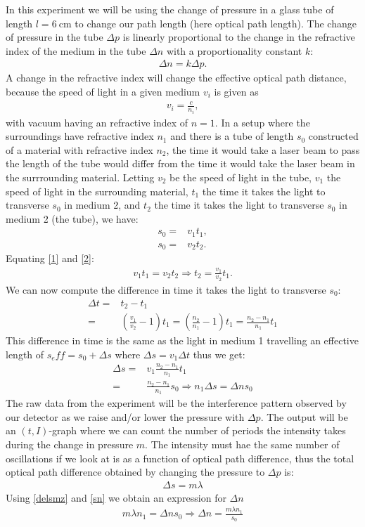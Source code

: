In this experiment we will be using the change of pressure in a glass tube of length $l = \SI{6}{\cm}$ to change our path length (here optical path length). The change of pressure in the tube $\Delta p$ is linearly proportional to the change in the refractive index of the medium in the tube $\Delta n$ with a proportionality constant $k$:
%
\begin{align}
    \Delta n = k \Delta p.
\label{pn}
\end{align}
%
A change in the refractive index will change the effective optical path distance, because the speed of light in a given medium $v_i$ is given as 
\begin{align}
    v_i = \frac{c}{n_i},
\end{align}
with vacuum having an refractive index of $n=1$. In a setup where the surroundings have refractive index $n_1$ and there is a tube of length $s_0$ constructed of a material with refractive index $n_2$, the time it would take a laser beam to pass the length of the tube would differ from the time it would take the laser beam in the surrrounding material. Letting $v_2$ be the speed of light in the tube, $v_1$ the speed of light in the surrounding material, $t_1$ the time it takes the light to transverse $s_0$ in medium 2, and $t_2$ the time it takes the light to transverse $s_0$ in medium 2 (the tube), we have:
%
\begin{align}
    s_0 = & v_1 t_1,
\label{1}\\
    s_0 = & v_2 t_2.
\label{2}
\end{align}
%
Equating \cref{1} and \cref{2}:
%
\begin{align}
    v_1 t_1 = v_2 t_2 \Rightarrow t_2 = \frac{v_1}{v_2}t_1.
\label{t2}
\end{align}
%
We can now compute the difference in time it takes the light to transverse $s_0$:
%
\begin{align}
\Delta t = &  t_2-t_1 \\
= & (\frac{v_1}{v_2}-1)t_1
=  (\frac{n_2}{n_1}-1)t_1 
= \frac{n_2-n_1}{n_1}t_1
\label{deltat}
\end{align}
%
This difference in time is the same as the light in medium 1 travelling an effective length of $s_eff=s_0+\Delta s$ where $\Delta s = v_1 \Delta t$ thus we get:
%
\begin{align}
\Delta s = & v_1\frac{n_2-n_1}{n_1}t_1\\
= & \frac{n_2-n_1}{n_1}s_0 \Rightarrow n_1\Delta s = \Delta n s_0
\label{sn}
\end{align}
%
The raw data from the experiment will be the interference pattern observed by our detector as we raise and/or lower the pressure with $\Delta p$. The output will be an $(t,I)$-graph where we can count the number of periods the intensity takes during the change in pressure $m$. The intensity must hae the same number of oscillations if we look at is as a function of optical path difference, thus the total optical path difference obtained by changing the pressure to $\Delta p$ is:
%
\begin{align}
\Delta s = m\lambda
\label{delsmz}
\end{align}
%
Using \cref{delsmz} and \cref{sn} we obtain an expression for $\Delta n$
%
\begin{align}
m\lambda n_1 = \Delta n s_0 \Rightarrow \Delta n = \frac{m \lambda n_1}{s_0}
\label{deln}
\end{align}

